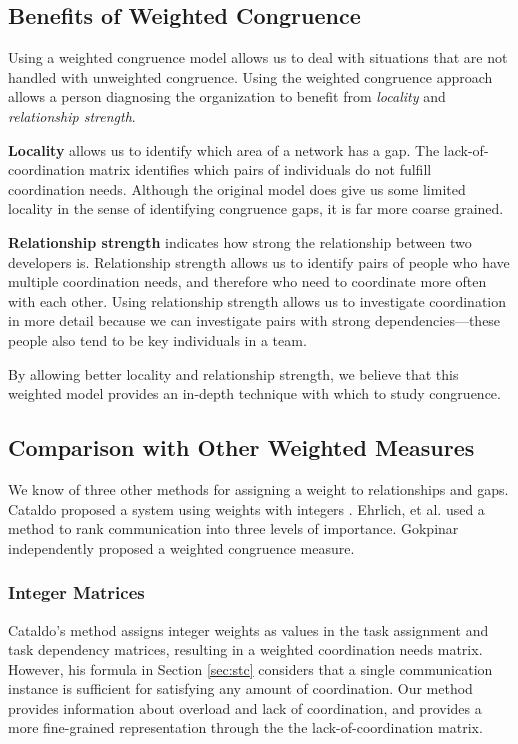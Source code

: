 \subsection{Benefits of Weighted Congruence}
\label{sec:benefit}

Using a weighted congruence model allows us to deal with situations that are not handled with unweighted congruence.
Using the weighted congruence approach allows a person diagnosing the organization to benefit from \emph{locality} and \emph{relationship strength}.

\textbf{Locality}
allows us to identify which area of a network has a gap.
The lack-of-coordination matrix identifies which pairs of individuals do not fulfill coordination needs.
Although the original model does give us some limited locality in the sense of identifying congruence gaps, it is far more coarse grained.

\textbf{Relationship strength}
indicates how strong the relationship between two developers is. Relationship strength allows us to identify pairs of people who have multiple coordination needs, and therefore who need to coordinate more often with each other. Using relationship strength allows us to investigate coordination in more detail because we can investigate pairs with strong dependencies---these people also tend to be key individuals in a team.

By allowing better locality and relationship strength, we believe that this weighted model provides an in-depth technique with which to study congruence.

\subsection{Comparison with Other Weighted Measures}
We know of three other methods for assigning a weight to relationships and gaps. Cataldo proposed a system using weights with integers \cite{cataldo:esem:2008}. Ehrlich, et al. \cite{ehrlich2008:gaps} used a method to rank communication into three levels of importance. Gokpinar \cite{gokpinar2010} independently proposed a weighted congruence measure.

\subsubsection{Integer Matrices}
Cataldo's method assigns integer weights as values in the task assignment and task dependency matrices, resulting in a weighted coordination needs matrix. However, his formula in Section \ref{sec:stc} considers that a single communication instance is sufficient for satisfying any amount of coordination. Our method provides information about overload and lack of coordination, and provides a more fine-grained representation through the the lack-of-coordination matrix.

